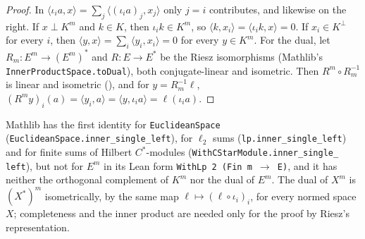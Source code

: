 \begin{proof}
\leanok
In $\langle \iota_i a, x \rangle = \sum_j \langle (\iota_i a)_j, x_j \rangle$ only $j = i$
contributes, and likewise on the right. If $x \perp K^m$ and $k \in K$, then $\iota_i k \in K^m$,
so $\langle k, x_i \rangle = \langle \iota_i k, x \rangle = 0$. If $x_i \in K^\perp$ for every
$i$, then $\langle y, x \rangle = \sum_i \langle y_i, x_i \rangle = 0$ for every $y \in K^m$. For
the dual, let $R_m \colon E^m \to (E^m)^*$ and $R \colon E \to E^*$ be the Riesz isomorphisms
(Mathlib's \texttt{InnerProductSpace.\allowbreak toDual}), both conjugate-linear and isometric.
Then $R^m \circ R_m^{-1}$ is linear and isometric (), and for
$y = R_m^{-1} \ell$, $(R^m y)_i(a) = \langle y_i, a \rangle = \langle y, \iota_i a \rangle =
\ell(\iota_i a)$.
\end{proof}

Mathlib has the first identity for \texttt{EuclideanSpace}
(\texttt{EuclideanSpace.\allowbreak inner\_\allowbreak single\_\allowbreak left}), for $\ell_2$
sums (\texttt{lp.\allowbreak inner\_\allowbreak single\_\allowbreak left}) and for finite sums of
Hilbert $C^*$-modules (\texttt{WithCStarModule.\allowbreak inner\_\allowbreak single\_\allowbreak
left}), but not for $E^m$ in its Lean form \texttt{WithLp 2 (Fin m $\to$ E)}, and it has neither
the orthogonal complement of $K^m$ nor the dual of $E^m$. The dual of $X^m$ is $(X^*)^m$
isometrically, by the same map $\ell \mapsto (\ell \circ \iota_i)_i$, for every normed space $X$;
completeness and the inner product are needed only for the proof by Riesz's representation.
